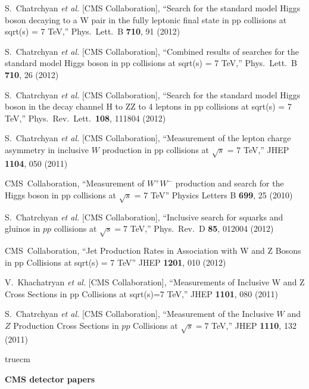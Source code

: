   S.~Chatrchyan {\it et al.}  [CMS Collaboration],
  ``Search for the standard model Higgs boson decaying to a W pair in the fully leptonic final state in pp collisions at sqrt(s) = 7 TeV,''
  Phys.\ Lett.\ B {\bf 710}, 91 (2012)

  S.~Chatrchyan {\it et al.}  [CMS Collaboration],
  ``Combined results of searches for the standard model Higgs boson in pp collisions at sqrt(s) = 7 TeV,''
  Phys.\ Lett.\ B {\bf 710}, 26 (2012)

  S.~Chatrchyan {\it et al.}  [CMS Collaboration],
  ``Search for the standard model Higgs boson in the decay channel H to ZZ to 4 leptons in pp collisions at sqrt(s) = 7 TeV,''
  Phys.\ Rev.\ Lett.\  {\bf 108}, 111804 (2012)

  S.~Chatrchyan {\it et al.} [CMS Collaboration],
  ``Measurement of the lepton charge asymmetry in inclusive $W$ production in pp collisions at $\sqrt{s}$ = 7 TeV,''
  JHEP {\bf 1104}, 050 (2011)

  CMS~Collaboration,
  ``Measurement of $W^+W^-$ production and search for the Higgs boson in pp collisions at $\sqrt{s}$ = 7 TeV''
  Physics Letters B {\bf 699}, 25 (2010)

  S.~Chatrchyan {\it et al.}  [CMS Collaboration],
  ``Inclusive search for squarks and gluinos in $pp$ collisions at $\sqrt{s}=7$ TeV,''
  Phys.\ Rev.\ D {\bf 85}, 012004 (2012)

  CMS~Collaboration,
  ``Jet Production Rates in Association with W and Z Bosons in pp Collisions at sqrt(s) = 7 TeV''
  JHEP {\bf 1201}, 010 (2012)

  V.~Khachatryan {\it et al.}  [CMS Collaboration],
  ``Measurements of Inclusive W and Z Cross Sections in pp Collisions at sqrt(s)=7 TeV,''
  JHEP {\bf 1101}, 080 (2011)

  S.~Chatrchyan {\it et al.} [CMS Collaboration],
  ``Measurement of the Inclusive $W$ and $Z$ Production Cross Sections in $pp$ Collisions at $\sqrt{s}=7$ TeV,''
  JHEP {\bf 1110}, 132 (2011)


 truecm

{\bf CMS detector papers}
\\

